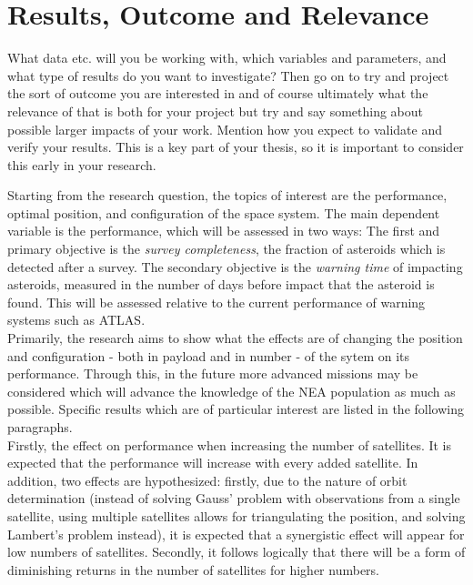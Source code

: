 \documentclass[12pt, english, NoHyper]{AE4010-template}
\begin{document}
\section{Results, Outcome and Relevance}
What data etc. will you be working with, which variables and parameters, and what type of results do you want to investigate? Then go on to try and project the sort of outcome you are interested in and of course ultimately what the relevance of that is both for your project but try and say something about possible larger impacts of your work. Mention how you expect to validate and verify your results. This is a key part of your thesis, so it is important to consider this early in your research.


Starting from the research question, the topics of interest are the performance, optimal position, and configuration of the space system. The main dependent variable is the performance, which will be assessed in two ways: The first and primary objective is the \textit{survey completeness}, the fraction of asteroids which is detected after a survey. The secondary objective is the \textit{warning time} of impacting asteroids, measured in the number of days before impact that the asteroid is found. This will be assessed relative to the current performance of warning systems such as ATLAS. \\

Primarily, the research aims to show what the effects are of changing the position and configuration - both in payload and in number - of the sytem on its performance. Through this, in the future more advanced missions may be considered which will advance the knowledge of the NEA population as much as possible. Specific results which are of particular interest are listed in the following paragraphs. \\

Firstly, the effect on performance when increasing the number of satellites. It is expected that the performance will increase with every added satellite. In addition, two effects are hypothesized: firstly, due to the nature of orbit determination (instead of solving Gauss' problem with observations from a single satellite, using multiple satellites allows for triangulating the position, and solving Lambert's problem instead), it is expected that a synergistic effect will appear for low numbers of satellites. Secondly, it follows logically that there will be a form of diminishing returns in the number of satellites for higher numbers. \\
\end{document}
